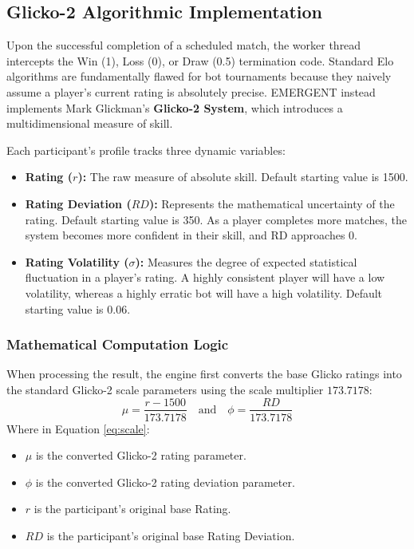 \documentclass[12pt,a4paper]{report}
\begin{document}
\subsection{Glicko-2 Algorithmic Implementation}
Upon the successful completion of a scheduled match, the worker thread intercepts the Win (1), Loss (0), or Draw (0.5) termination code. Standard Elo algorithms are fundamentally flawed for bot tournaments because they naively assume a player's current rating is absolutely precise. EMERGENT instead implements Mark Glickman's \textbf{Glicko-2 System}, which introduces a multidimensional measure of skill. 

Each participant's profile tracks three dynamic variables:
\begin{itemize}
    \item \textbf{Rating ($r$):} The raw measure of absolute skill. Default starting value is 1500.
    \item \textbf{Rating Deviation ($RD$):} Represents the mathematical uncertainty of the rating. Default starting value is 350. As a player completes more matches, the system becomes more confident in their skill, and RD approaches 0.
    \item \textbf{Rating Volatility ($\sigma$):} Measures the degree of expected statistical fluctuation in a player's rating. A highly consistent player will have a low volatility, whereas a highly erratic bot will have a high volatility. Default starting value is 0.06.
\end{itemize}

\subsubsection*{Mathematical Computation Logic}
When processing the result, the engine first converts the base Glicko ratings into the standard Glicko-2 scale parameters using the scale multiplier $173.7178$:
\begin{equation} \label{eq:scale}
    \mu = \frac{r - 1500}{173.7178} \quad \text{and} \quad \phi = \frac{RD}{173.7178}
\end{equation}
Where in Equation \ref{eq:scale}:
\begin{itemize}
    \item $\mu$ is the converted Glicko-2 rating parameter.
    \item $\phi$ is the converted Glicko-2 rating deviation parameter.
    \item $r$ is the participant's original base Rating.
    \item $RD$ is the participant's original base Rating Deviation.
\end{itemize}
\end{document}

